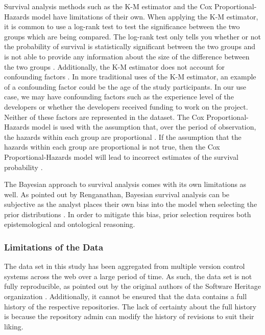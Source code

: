 \documentclass[acmconf]{acmart}
\begin{document}
Survival analysis methods such as the K-M estimator and the Cox Proportional-Hazards model have limitations of their own. When applying the K-M estimator, it is common to use a log-rank test to test the significance between the two groups which are being compared. The log-rank test only tells you whether or not the probability of survival is statistically significant between the two groups and is not able to provide any information about the size of the difference between the two groups \cite{stel2011kaplan}. Additionally, the K-M estimator does not account for confounding factors \cite{stel2011kaplan}. In more traditional uses of the K-M estimator, an example of a confounding factor could be the age of the study participants.
In our use case, we may have confounding factors such as the experience level of the developers or whether the developers received funding to work on the project.
Neither of these factors are represented in the dataset.
The Cox Proportional-Hazards model is used with the assumption that, over the period of observation, the hazards within each group are proportional \cite{stel2011cox}.
If the assumption that the hazards within each group are proportional is not true, then the Cox Proportional-Hazards model will lead to incorrect estimates of the survival probability \cite{stel2011cox}.

The Bayesian approach to survival analysis comes with its own limitations as well. As pointed out by Renganathan, Bayesian survival analysis can be subjective as the analyst places their own bias into the model when selecting the prior distributions \cite{renganathan2016overview}. In order to mitigate this bias, prior selection requires both epistemological and ontological reasoning.

\subsubsection{Limitations of the Data}

The data set in this study has been aggregated from multiple version control systems across the web over a large period of time.
As such, the data set is not fully reproducible, as pointed out by the original authors of the Software Heritage organization \cite{pietri2019software}.
Additionally, it cannot be ensured that the data contains a full history of the respective repositories.
The lack of certainty about the full history is because the repository admin can modify the history of revisions to suit their liking.
\end{document}
